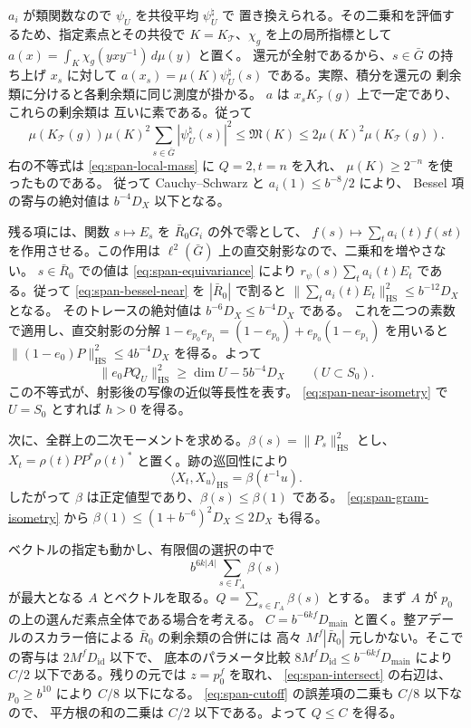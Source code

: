 \(a_i\) が類関数なので \(\psi_U\) を共役平均 \(\psi_U^\natural\) で
置き換えられる。その二乗和を評価するため、指定素点とその共役で
\(K=K_{\mathcal T}\)、\(\chi_g\) を上の局所指標として
\(a(x)=\int_K\chi_g(yxy^{-1})\,d\mu(y)\) と置く。
還元が全射であるから、\(s\in\bar G\) の持ち上げ \(x_s\) に対して
\(a(x_s)=\mu(K)\psi_U^\natural(s)\) である。実際、積分を還元の
剰余類に分けると各剰余類に同じ測度が掛かる。
\(a\) は \(x_sK_{\mathcal T}(g)\) 上で一定であり、これらの剰余類は
互いに素である。従って
\[
 \mu(K_{\mathcal T}(g))\mu(K)^2\sum_{s\in\bar G}|\psi_U^\natural(s)|^2
 \le \mathfrak M(K)
 \le 2\mu(K)^2\mu(K_{\mathcal T}(g)).
\]
右の不等式は \eqref{eq:span-local-mass} に \(Q=2,t=n\) を入れ、
\(\mu(K)\ge2^{-n}\) を使ったものである。
従って Cauchy--Schwarz と \(a_i(1)\le b^{-8}/2\) により、
Bessel 項の寄与の絶対値は \(b^{-4}D_X\) 以下となる。

残る項には、関数 \(s\mapsto E_s\) を \(\bar R_0G_i\) の外で零として、
\(f(s)\mapsto\sum_t a_i(t)f(st)\) を作用させる。この作用は
\(\ell^2(\bar G)\) 上の直交射影なので、二乗和を増やさない。
\(s\in\bar R_0\) での値は \eqref{eq:span-equivariance} により
\(r_\psi(s)\sum_t a_i(t)E_t\) である。従って \eqref{eq:span-bessel-near} を
\(|\bar R_0|\) で割ると
\(\|\sum_t a_i(t)E_t\|_{\mathrm{HS}}^2\le b^{-12}D_X\) となる。
そのトレースの絶対値は \(b^{-6}D_X\le b^{-4}D_X\) である。
これを二つの素数で適用し、直交射影の分解
\(1-e_{p_0}e_{p_1}=(1-e_{p_0})+e_{p_0}(1-e_{p_1})\) を用いると
\(\|(1-e_0)P\|_{\mathrm{HS}}^2\le4b^{-4}D_X\) を得る。よって
\begin{equation}\label{eq:span-near-isometry}
 \|e_0P Q_U\|_{\mathrm{HS}}^2\geq \dim U-5b^{-4}D_X
       \qquad(U\subset S_0).
\end{equation}
\noindent
この不等式が、射影後の写像の近似等長性を表す。
\eqref{eq:span-near-isometry} で \(U=S_0\) とすれば \(h>0\) を得る。

次に、全群上の二次モーメントを求める。\(\beta(s)=\|P_s\|_{\mathrm{HS}}^2\) とし、
\(X_t=\rho(t)PP^*\rho(t)^*\) と置く。跡の巡回性により
\[
 \langle X_t,X_u\rangle_{\mathrm{HS}}=\beta(t^{-1}u).
\]
したがって \(\beta\) は正定値型であり、\(\beta(s)\leq\beta(1)\) である。
\eqref{eq:span-gram-isometry} から
\(\beta(1)\le(1+b^{-6})^2D_X\le2D_X\) も得る。

ベクトルの指定も動かし、有限個の選択の中で
\[
 b^{6k|A|}\sum_{s\in\Gamma_A}\beta(s)
\]
が最大となる \(A\) とベクトルを取る。\(Q=\sum_{s\in\Gamma_A}\beta(s)\) とする。
まず \(A\) が \(p_0\) の上の選んだ素点全体である場合を考える。
\(C=b^{-6kf}D_{\mathrm{main}}\) と置く。整アデールのスカラー倍による
\(\bar R_0\) の剰余類の合併には
高々 \(M^f|\bar R_0|\) 元しかない。そこでの寄与は \(2 M^fD_{\mathrm{id}}\) 以下で、
底本のパラメータ比較 \(8 M^f D_{\mathrm{id}}\le b^{-6kf}D_{\mathrm{main}}\)
により \(C/2\) 以下である。残りの元では \(z=p_0^f\) を取れ、
\eqref{eq:span-intersect} の右辺は、\(p_0\ge b^{10}\) により \(C/8\) 以下になる。
\eqref{eq:span-cutoff} の誤差項の二乗も \(C/8\) 以下なので、
平方根の和の二乗は \(C/2\) 以下である。よって \(Q\le C\) を得る。


